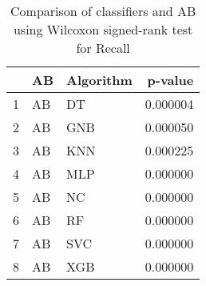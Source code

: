 \begin{table}
\footnotesize
\caption{Comparison of classifiers and AB using Wilcoxon signed-rank test for Recall}
\label{tab:AB wilcoxon Recall comparison}
\begin{tabular}{lllr}
\hline
 & AB & Algorithm & p-value \\
\hline
1 & AB & DT & 0.000004 \\
2 & AB & GNB & 0.000050 \\
3 & AB & KNN & 0.000225 \\
4 & AB & MLP & 0.000000 \\
5 & AB & NC & 0.000000 \\
6 & AB & RF & 0.000000 \\
7 & AB & SVC & 0.000000 \\
8 & AB & XGB & 0.000000 \\
\hline
\end{tabular}
\end{table}
